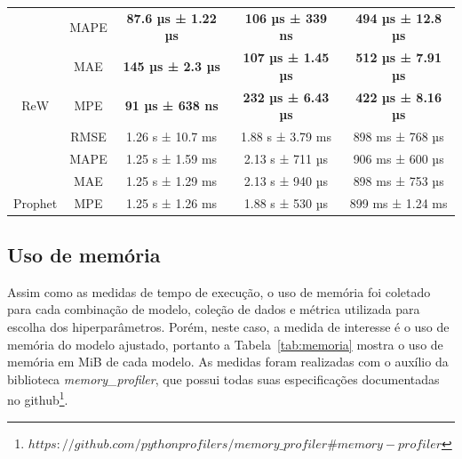 \begin{table}[htbp]
\begin{tabular}{@{}ccccc@{}}
                                  & MAPE                      & \multicolumn{1}{c}{\textbf{87.6 µs ± 1.22 µs}} & \multicolumn{1}{c}{\textbf{106 µs ± 339 ns}}  & \textbf{494 µs ± 12.8 µs} \\
                                  & MAE                       & \multicolumn{1}{c}{\textbf{145 µs ± 2.3 µs}}   & \multicolumn{1}{c}{\textbf{107 µs ± 1.45 µs}} & \textbf{512 µs ± 7.91 µs} \\
        \multirow{-4}{*}{ReW}     & MPE                       & \multicolumn{1}{c}{\textbf{91 µs ± 638 ns}}    & \multicolumn{1}{c}{\textbf{232 µs ± 6.43 µs}} & \textbf{422 µs ± 8.16 µs} \\ \midrule
                                  & RMSE                      & \multicolumn{1}{c}{1.26 s ± 10.7 ms}           & \multicolumn{1}{c}{1.88 s ± 3.79 ms}          & 898 ms ± 768 µs           \\
                                  & MAPE                      & \multicolumn{1}{c}{1.25 s ± 1.59 ms}           & \multicolumn{1}{c}{2.13 s ± 711 µs}           & 906 ms ± 600 µs           \\
                                  & MAE                       & \multicolumn{1}{c}{1.25 s ± 1.29 ms}           & \multicolumn{1}{c}{2.13 s ± 940 µs}           & 898 ms ± 753 µs           \\
        \multirow{-4}{*}{Prophet} & MPE                       & \multicolumn{1}{c}{1.25 s ± 1.26 ms}           & \multicolumn{1}{c}{1.88 s ± 530 µs}           & 899 ms ± 1.24 ms          \\ \bottomrule
    \end{tabular}
\end{table}

\FloatBarrier

\subsection{Uso de memória}
Assim como as medidas de tempo de execução, o uso de memória foi coletado para cada combinação de modelo, coleção de dados e métrica utilizada para escolha dos hiperparâmetros. Porém, neste caso, a medida de interesse é o uso de memória do modelo ajustado, portanto a Tabela~\ref{tab:memoria} mostra o uso de memória em MiB de cada modelo. As medidas foram realizadas com o auxílio da biblioteca \textit{memory\_profiler}, que possui todas suas especificações documentadas no github\footnote{$https://github.com/pythonprofilers/memory\_profiler\#memory-profiler$}.


